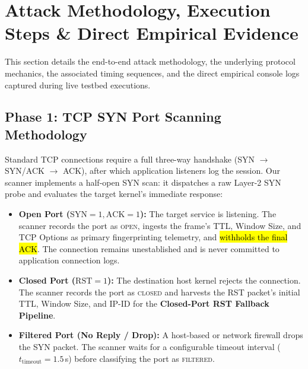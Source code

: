 \section{Attack Methodology, Execution Steps \& Direct Empirical Evidence}\label{sec:steps}

This section details the end-to-end attack methodology, the underlying protocol mechanics, the
associated timing sequences, and the direct empirical console logs captured during live testbed
executions.

\subsection{Phase 1: TCP SYN Port Scanning Methodology}
Standard TCP connections require a full three-way handshake (SYN $\to$ SYN/ACK $\to$ ACK), after
which application listeners log the session. Our scanner implements a half-open SYN scan: it
dispatches a raw Layer-2 SYN probe and evaluates the target kernel's immediate response:
\begin{itemize}
    \item \textbf{Open Port ($\text{SYN}=1, \text{ACK}=1$):} The target service is listening. The
    scanner records the port as \textsc{open}, ingests the frame's TTL, Window Size, and TCP Options
    as primary fingerprinting telemetry, and \hl{withholds the final ACK}. The connection remains
    unestablished and is never committed to application connection logs.
    \item \textbf{Closed Port ($\text{RST}=1$):} The destination host kernel rejects the connection.
    The scanner records the port as \textsc{closed} and harvests the RST packet's initial TTL,
    Window Size, and IP-ID for the \textbf{Closed-Port RST Fallback Pipeline}.
    \item \textbf{Filtered Port (No Reply / Drop):} A host-based or network firewall drops the SYN
    packet. The scanner waits for a configurable timeout interval ($t_{\text{timeout}} = 1.5$\,s)
    before classifying the port as \textsc{filtered}.
\end{itemize}

